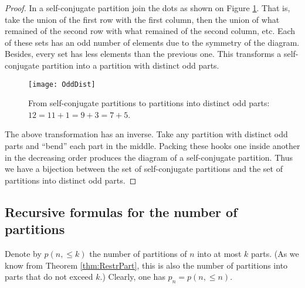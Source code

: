 \begin{page}
\setcounter{section}{3}
\setcounter{subsection}{7}
\setcounter{dfn}{16}
\label{portion:937}

\begin{proof}
In a self-conjugate partition join the dots as shown on Figure \ref{fig:OddDist}.
That is, take the union of the first row with the first column,
then the union of what remained of the second row with what remained of the second column, etc.
Each of these sets has an odd number of elements due to the symmetry of the diagram.
Besides, every set has less elements than the previous one.
This transforms a self-conjugate partition into a partition with distinct odd parts.

\begin{figure}[ht]
\begin{center}
\texttt{[image: OddDist]}
\end{center}
\caption{From self-conjugate partitions to partitions into distinct odd parts: $12 = 11 + 1 = 9 + 3 = 7 + 5$.}
\label{fig:OddDist}
\end{figure}

The above transformation has an inverse.
Take any partition with distinct odd parts and ``bend'' each part in the middle.
Packing these hooks one inside another in the decreasing order produces the diagram of a self-conjugate partition.
Thus we have a bijection between the set of self-conjugate partitions and the set of partitions into distinct odd parts.
\end{proof}






\end{page}

\begin{page}
\setcounter{section}{3}
\setcounter{subsection}{7}
\setcounter{dfn}{16}
\label{portion:939}

\subsection{Recursive formulas for the number of partitions}
Denote by $p(n, \le k)$ the number of partitions of $n$ into at most $k$ parts.
(As we know from Theorem \ref{thm:RestrPart}, this is also the number of partitions into parts that do not exceed $k$.)
Clearly, one has $p_n = p(n, \le n)$.



\end{page}

